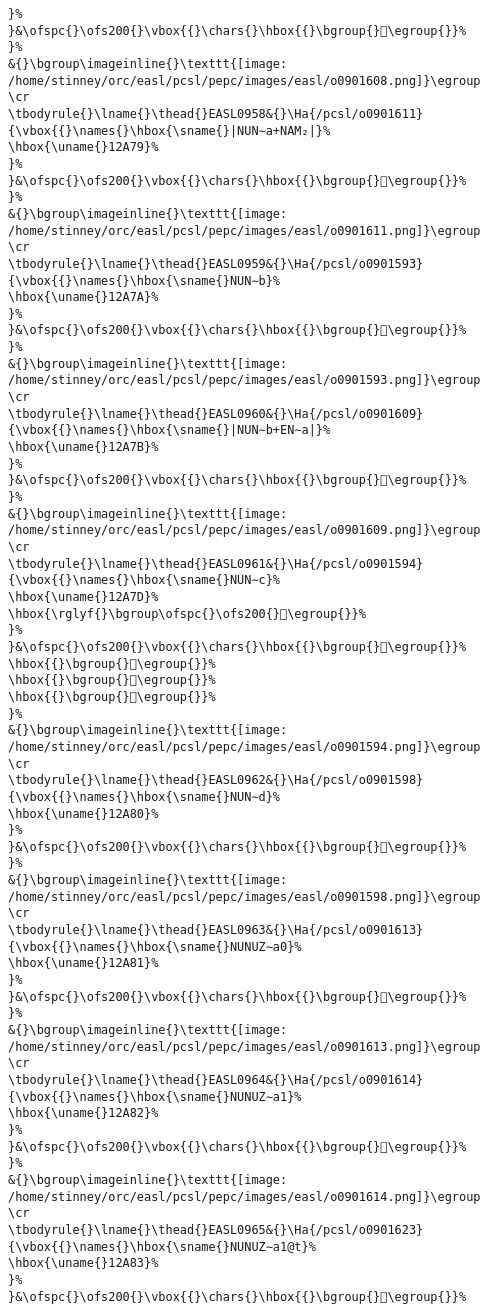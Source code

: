 \begin{verbatim}
}%
}&\ofspc{}\ofs200{}\vbox{{}\chars{}\hbox{{}\bgroup{}𒩸\egroup{}}%
}%
&{}\bgroup\imageinline{}\texttt{[image: /home/stinney/orc/easl/pcsl/pepc/images/easl/o0901608.png]}\egroup
\cr
\tbodyrule{}\lname{}\thead{}EASL0958&{}\Ha{/pcsl/o0901611}{\vbox{{}\names{}\hbox{\sname{}|NUN∼a+NAM₂|}%
\hbox{\uname{}12A79}%
}%
}&\ofspc{}\ofs200{}\vbox{{}\chars{}\hbox{{}\bgroup{}𒩹\egroup{}}%
}%
&{}\bgroup\imageinline{}\texttt{[image: /home/stinney/orc/easl/pcsl/pepc/images/easl/o0901611.png]}\egroup
\cr
\tbodyrule{}\lname{}\thead{}EASL0959&{}\Ha{/pcsl/o0901593}{\vbox{{}\names{}\hbox{\sname{}NUN∼b}%
\hbox{\uname{}12A7A}%
}%
}&\ofspc{}\ofs200{}\vbox{{}\chars{}\hbox{{}\bgroup{}𒩺\egroup{}}%
}%
&{}\bgroup\imageinline{}\texttt{[image: /home/stinney/orc/easl/pcsl/pepc/images/easl/o0901593.png]}\egroup
\cr
\tbodyrule{}\lname{}\thead{}EASL0960&{}\Ha{/pcsl/o0901609}{\vbox{{}\names{}\hbox{\sname{}|NUN∼b+EN∼a|}%
\hbox{\uname{}12A7B}%
}%
}&\ofspc{}\ofs200{}\vbox{{}\chars{}\hbox{{}\bgroup{}𒩻\egroup{}}%
}%
&{}\bgroup\imageinline{}\texttt{[image: /home/stinney/orc/easl/pcsl/pepc/images/easl/o0901609.png]}\egroup
\cr
\tbodyrule{}\lname{}\thead{}EASL0961&{}\Ha{/pcsl/o0901594}{\vbox{{}\names{}\hbox{\sname{}NUN∼c}%
\hbox{\uname{}12A7D}%
\hbox{\rglyf{}\bgroup\ofspc{}\ofs200{}𒩽\egroup{}}%
}%
}&\ofspc{}\ofs200{}\vbox{{}\chars{}\hbox{{}\bgroup{}𒩼\egroup{}}%
\hbox{{}\bgroup{}𒩽\egroup{}}%
\hbox{{}\bgroup{}𒩾\egroup{}}%
\hbox{{}\bgroup{}𒩿\egroup{}}%
}%
&{}\bgroup\imageinline{}\texttt{[image: /home/stinney/orc/easl/pcsl/pepc/images/easl/o0901594.png]}\egroup
\cr
\tbodyrule{}\lname{}\thead{}EASL0962&{}\Ha{/pcsl/o0901598}{\vbox{{}\names{}\hbox{\sname{}NUN∼d}%
\hbox{\uname{}12A80}%
}%
}&\ofspc{}\ofs200{}\vbox{{}\chars{}\hbox{{}\bgroup{}𒪀\egroup{}}%
}%
&{}\bgroup\imageinline{}\texttt{[image: /home/stinney/orc/easl/pcsl/pepc/images/easl/o0901598.png]}\egroup
\cr
\tbodyrule{}\lname{}\thead{}EASL0963&{}\Ha{/pcsl/o0901613}{\vbox{{}\names{}\hbox{\sname{}NUNUZ∼a0}%
\hbox{\uname{}12A81}%
}%
}&\ofspc{}\ofs200{}\vbox{{}\chars{}\hbox{{}\bgroup{}𒪁\egroup{}}%
}%
&{}\bgroup\imageinline{}\texttt{[image: /home/stinney/orc/easl/pcsl/pepc/images/easl/o0901613.png]}\egroup
\cr
\tbodyrule{}\lname{}\thead{}EASL0964&{}\Ha{/pcsl/o0901614}{\vbox{{}\names{}\hbox{\sname{}NUNUZ∼a1}%
\hbox{\uname{}12A82}%
}%
}&\ofspc{}\ofs200{}\vbox{{}\chars{}\hbox{{}\bgroup{}𒪂\egroup{}}%
}%
&{}\bgroup\imageinline{}\texttt{[image: /home/stinney/orc/easl/pcsl/pepc/images/easl/o0901614.png]}\egroup
\cr
\tbodyrule{}\lname{}\thead{}EASL0965&{}\Ha{/pcsl/o0901623}{\vbox{{}\names{}\hbox{\sname{}NUNUZ∼a1@t}%
\hbox{\uname{}12A83}%
}%
}&\ofspc{}\ofs200{}\vbox{{}\chars{}\hbox{{}\bgroup{}𒪃\egroup{}}%

\end{verbatim}
